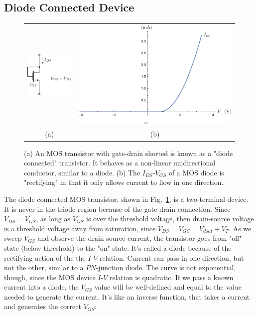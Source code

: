 \subsection{Diode Connected Device}
\begin{figure}[tb]
\centering
\begin{tabular}{cc}
\includegraphics[scale=1]{3mos_diode.pdf} &
\includegraphics[width=.5\columnwidth]{ivrect.pdf}\\
(a) & (b)\\
\end{tabular}
\caption{(a) An MOS transistor with gate-drain shorted is known as a "diode connected" transistor.  It behaves as a non-linear unidirectional conductor, similar to a diode.  (b) The $I_{DS}$-$V_{GS}$ of a MOS diode is "rectifying" in that it only allows current to flow in one direction.}
\label{fig:3mos_diode.pdf}
\end{figure}
The diode connected MOS transistor, shown in Fig.~\ref{fig:3mos_diode.pdf}, is a two-terminal device.  It is never in the triode region because of the gate-drain connection.  Since $V_{DS} = V_{GS}$, as long as $V_{GS}$ is over the threshold voltage, then drain-source voltage is a threshold voltage away from saturation, since $V_{DS} = V_{GS} = V_{dsat} + V_T$.  As we sweep $V_{GS}$ and observe the drain-source current, the transistor goes from "off" state (below threshold) to the "on" state.  It's called a diode because of the rectifying action of the the $I$-$V$ relation. Current can pass in one direction, but not the other, similar to a $PN$-junction diode.  The curve is not exponential, though, since the MOS device $I$-$V$ relation is quadratic.  If we pass a known current into a diode, the $V_{GS}$ value will be well-defined and equal to the value needed to generate the current. It's like an inverse function, that takes a current and generates the correct $V_{GS}$:
